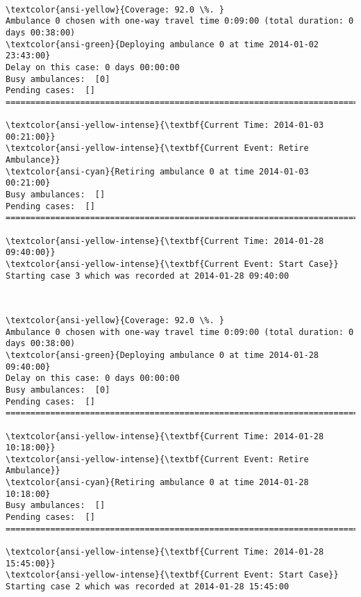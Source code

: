 \documentclass[11pt]{article}
\begin{document}
    \begin{center}
    \end{center}
    { \hspace*{\fill} \\}
    
    \begin{Verbatim}[commandchars=\\\{\}]
\textcolor{ansi-yellow}{Coverage: 92.0 \%. }
Ambulance 0 chosen with one-way travel time 0:09:00 (total duration: 0 days 00:38:00)
\textcolor{ansi-green}{Deploying ambulance 0 at time 2014-01-02 23:43:00}
Delay on this case: 0 days 00:00:00
Busy ambulances:  [0]
Pending cases:  []
========================================================================

\textcolor{ansi-yellow-intense}{\textbf{Current Time: 2014-01-03 00:21:00}}
\textcolor{ansi-yellow-intense}{\textbf{Current Event: Retire Ambulance}}
\textcolor{ansi-cyan}{Retiring ambulance 0 at time 2014-01-03 00:21:00}
Busy ambulances:  []
Pending cases:  []
========================================================================

\textcolor{ansi-yellow-intense}{\textbf{Current Time: 2014-01-28 09:40:00}}
\textcolor{ansi-yellow-intense}{\textbf{Current Event: Start Case}}
Starting case 3 which was recorded at 2014-01-28 09:40:00

    \end{Verbatim}

    \begin{center}
    \end{center}
    { \hspace*{\fill} \\}
    
    \begin{Verbatim}[commandchars=\\\{\}]
\textcolor{ansi-yellow}{Coverage: 92.0 \%. }
Ambulance 0 chosen with one-way travel time 0:09:00 (total duration: 0 days 00:38:00)
\textcolor{ansi-green}{Deploying ambulance 0 at time 2014-01-28 09:40:00}
Delay on this case: 0 days 00:00:00
Busy ambulances:  [0]
Pending cases:  []
========================================================================

\textcolor{ansi-yellow-intense}{\textbf{Current Time: 2014-01-28 10:18:00}}
\textcolor{ansi-yellow-intense}{\textbf{Current Event: Retire Ambulance}}
\textcolor{ansi-cyan}{Retiring ambulance 0 at time 2014-01-28 10:18:00}
Busy ambulances:  []
Pending cases:  []
========================================================================

\textcolor{ansi-yellow-intense}{\textbf{Current Time: 2014-01-28 15:45:00}}
\textcolor{ansi-yellow-intense}{\textbf{Current Event: Start Case}}
Starting case 2 which was recorded at 2014-01-28 15:45:00

    \end{Verbatim}
\end{document}
